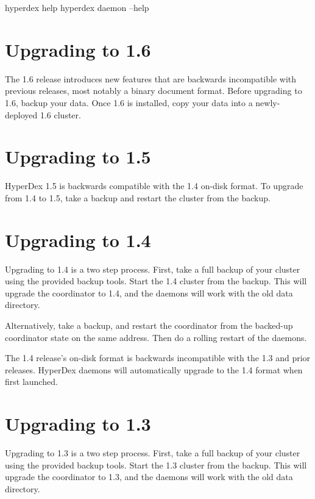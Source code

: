 \begin{consolecode}
hyperdex help
hyperdex daemon --help
\end{consolecode}

\section{Upgrading to 1.6}
\label{sec:installation:upgrade1.6}

The 1.6 release introduces new features that are backwards incompatible with
previous releases, most notably a binary document format.  Before upgrading to
1.6, backup your data.  Once 1.6 is installed, copy your data into a
newly-deployed 1.6 cluster.

\section{Upgrading to 1.5}
\label{sec:installation:upgrade1.5}

HyperDex 1.5 is backwards compatible with the 1.4 on-disk format.  To upgrade
from 1.4 to 1.5, take a backup and restart the cluster from the backup.

\section{Upgrading to 1.4}
\label{sec:installation:upgrade1.4}

Upgrading to 1.4 is a two step process.  First, take a full backup of your
cluster using the provided backup tools.  Start the 1.4 cluster from the
backup.  This will upgrade the coordinator to 1.4, and the daemons will work
with the old data directory.

Alternatively, take a backup, and restart the coordinator from the backed-up
coordinator state on the same address.  Then do a rolling restart of the
daemons.

The 1.4 release's on-disk format is backwards incompatible with the 1.3 and
prior releases.  HyperDex daemons will automatically upgrade to the 1.4 format
when first launched.

\section{Upgrading to 1.3}
\label{sec:installation:upgrade1.3}

Upgrading to 1.3 is a two step process.  First, take a full backup of your
cluster using the provided backup tools.  Start the 1.3 cluster from the
backup.  This will upgrade the coordinator to 1.3, and the daemons will work
with the old data directory.

